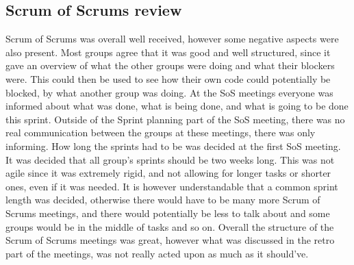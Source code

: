 \subsection{Scrum of Scrums review}\label{sec:sosreview}
Scrum of Scrums was overall well received, however some negative aspects were also present.
Most groups agree that it was good and well structured, since it gave an overview of what the other groups were doing and what their blockers were.
This could then be used to see how their own code could potentially be blocked, by what another group was doing.
At the SoS meetings everyone was informed about what was done, what is being done, and what is going to be done this sprint.
Outside of the Sprint planning part of the SoS meeting, there was no real communication between the groups at these meetings, there was only informing.
How long the sprints had to be was decided at the first SoS meeting.
It was decided that all group's sprints should be two weeks long. This was not agile since it was extremely rigid, and not allowing for longer tasks or shorter ones, even if it was needed.
It is however understandable that a common sprint length was decided, otherwise there would have to be many more Scrum of Scrums meetings, and there would potentially be less to talk about and some groups would be in the middle of tasks and so on.
Overall the structure of the Scrum of Scrums meetings was great, however what was discussed in the retro part of the meetings, was not really acted upon as much as it should've.
